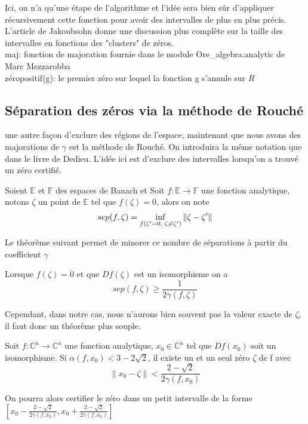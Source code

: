 \documentclass[a4paper,10.5pt]{article}
\begin{document}
	\noindent Ici, on n'a qu'une étape de l'algorithme et l'idée sera bien sûr d'appliquer récursivement cette fonction pour avoir des intervalles de plus en plus précis. L'article de Jakoubsohn donne une discussion plus complète sur la taille des intervalles en fonctions des "clusters" de zéros.\\
	\noindent maj: fonction de majoration fournie dans le module Ore\_algebra.analytic de Marc Mezzarobba\\
	zéropositif(g): le premier zéro sur lequel la fonction g s'annule sur ${R}$
	
	
	\subsection{Séparation des zéros via la méthode de Rouché}
	une autre façon d'exclure des régions de l'espace, maintenant que nous avons des majorations de $\gamma$ est la méthode de Rouché. On introduira la même notation que dans le livre de Dedieu. L'idée ici est d'exclure des intervalles lorsqu'on a trouvé un zéro certifié.\\
	\begin{definition} Soient $\mathbb{E}$ et $\mathbb{F}$ des espaces de Banach et 
		Soit $f:\mathbb{E}\rightarrow \mathbb{F}$ une fonction analytique, notons $\zeta$ un point de $\mathbb{E}$ tel que $f(\zeta)=0$, alors on note
		\[sep(f,\zeta)=\inf_{f(\zeta '=0, \hspace{1mm} \zeta \neq \zeta ')}\left\|\zeta-\zeta '\right\|\] 
	\end{definition}
	
		Le théorème suivant permet de minorer ce nombre de séparations à partir du coefficient $\gamma$\\
	\begin{theorem} Lorsque $f(\zeta)=0$ et que $Df(\zeta)$ est un isomorphisme on a 
		\[sep(f,\zeta) \geq \frac{1}{2\gamma(f,\zeta)}\]
	
	\end{theorem}
	Cependant, dans notre cas, nous n'aurons bien souvent pas la valeur exacte de $\zeta$, il faut donc un théorème plus souple. 
	\begin{theorem} Soit $f: \mathbb{C}^n\rightarrow \mathbb{C}^n$ une fonction analytique, $x_0 \in \mathbb{C}^n$ tel que $Df(x_0)$ soit un isomorphisme. Si $\alpha(f,x_0)<3-2\sqrt{2}$, il existe un et un seul zéro $\zeta$ de f avec
		\[\left\|x_0-\zeta \right\|<\frac{2-\sqrt{2}}{2\gamma(f,x_0)}\]
	\end{theorem}
	
	\noindent On pourra alors certifier le zéro dans un petit intervalle de la forme $[x_0-\frac{2-\sqrt{2}}{2\gamma(f,x_0)},x_0+\frac{2-\sqrt{2}}{2\gamma(f,x_0)}]$
	
\end{document}
